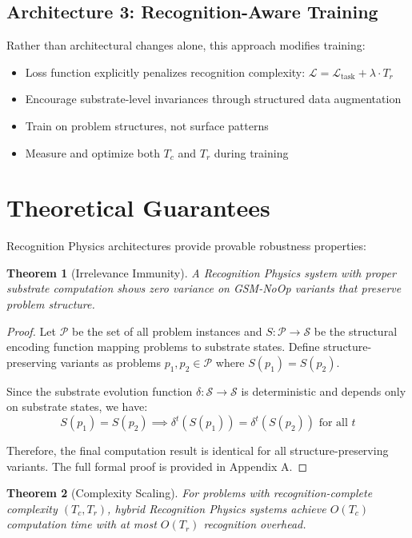 \documentclass[11pt,letterpaper]{article}
\theoremstyle{plain}
\newtheorem{theorem}{Theorem}
\theoremstyle{definition}
\theoremstyle{remark}
\begin{document}
\subsection{Architecture 3: Recognition-Aware Training}

Rather than architectural changes alone, this approach modifies training:
\begin{itemize}
\item Loss function explicitly penalizes recognition complexity: $\mathcal{L} = \mathcal{L}_{\text{task}} + \lambda \cdot T_r$
\item Encourage substrate-level invariances through structured data augmentation
\item Train on problem structures, not surface patterns
\item Measure and optimize both $T_c$ and $T_r$ during training
\end{itemize}

\section{Theoretical Guarantees}
\label{sec:guarantees}

Recognition Physics architectures provide provable robustness properties:

\begin{theorem}[Irrelevance Immunity]
A Recognition Physics system with proper substrate computation shows zero variance on GSM-NoOp variants that preserve problem structure.
\end{theorem}

\begin{proof}
Let $\mathcal{P}$ be the set of all problem instances and $S: \mathcal{P} \rightarrow \mathcal{S}$ be the structural encoding function mapping problems to substrate states. Define structure-preserving variants as problems $p_1, p_2 \in \mathcal{P}$ where $S(p_1) = S(p_2)$.

Since the substrate evolution function $\delta: \mathcal{S} \rightarrow \mathcal{S}$ is deterministic and depends only on substrate states, we have:
\[S(p_1) = S(p_2) \implies \delta^t(S(p_1)) = \delta^t(S(p_2)) \text{ for all } t\]

Therefore, the final computation result is identical for all structure-preserving variants. The full formal proof is provided in Appendix A.
\end{proof}

\begin{theorem}[Complexity Scaling]
For problems with recognition-complete complexity $(T_c, T_r)$, hybrid Recognition Physics systems achieve $O(T_c)$ computation time with at most $O(T_r)$ recognition overhead.
\end{theorem}
\end{document}
